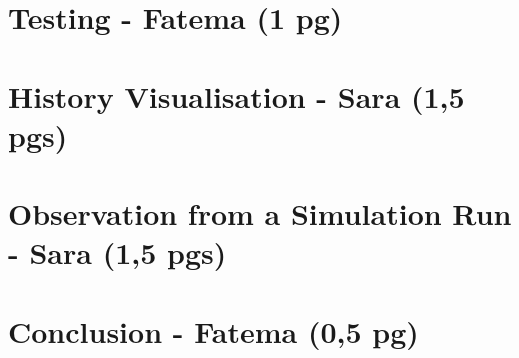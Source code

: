 \documentclass{article}
\begin{document}
\section{Testing - Fatema (1 pg)}

\section{History Visualisation - Sara (1,5 pgs)}
\section{Observation from a Simulation Run - Sara (1,5 pgs)}

\section{Conclusion - Fatema (0,5 pg)}
\end{document}
